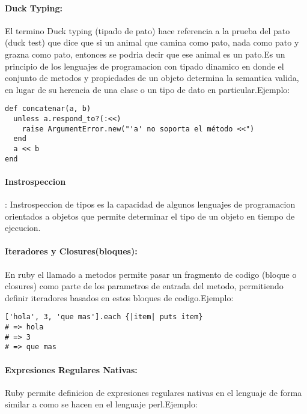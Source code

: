 \paragraph{Duck Typing:}
El termino Duck typing (tipado de pato) hace referencia a la prueba del pato (duck test) que dice que si un animal que camina como pato, nada como pato y grazna como pato, entonces se podria decir que ese animal es un pato.\newline Es un principio de los lenguajes de programacion con tipado dinamico en donde el conjunto de metodos y propiedades de un objeto determina la semantica valida, en lugar de su herencia de una clase o un tipo de dato en particular.\newline Ejemplo:

\begin{verbatim}
def concatenar(a, b)
  unless a.respond_to?(:<<)
    raise ArgumentError.new("'a' no soporta el método <<")
  end
  a << b
end
\end{verbatim}

\paragraph{Instrospeccion}:
Instrospeccion de tipos es la capacidad de algunos lenguajes de programacion orientados a objetos que permite determinar el tipo de un objeto en tiempo de ejecucion.

\paragraph{Iteradores y Closures(bloques):}
En ruby el llamado a metodos permite pasar un fragmento de codigo (bloque o closures) como parte de los parametros de entrada del metodo, permitiendo definir iteradores basados en estos bloques de codigo.\newline Ejemplo:

\begin{verbatim}
['hola', 3, 'que mas'].each {|item| puts item}
# => hola
# => 3
# => que mas
\end{verbatim}


\paragraph{Expresiones Regulares Nativas:}
Ruby permite definicion de expresiones regulares nativas en el lenguaje de forma similar a como se hacen en el lenguaje perl.\newline Ejemplo:

